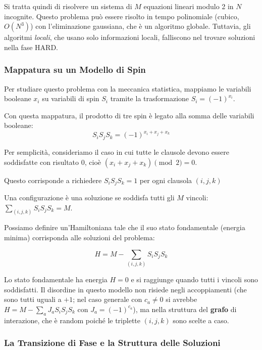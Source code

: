 Si tratta quindi di risolvere un sistema di $M$ equazioni lineari modulo 2 in $N$ incognite. Questo problema può essere risolto in tempo polinomiale (cubico, $O(N^3)$) con l'eliminazione gaussiana, che è un algoritmo globale. 
Tuttavia, gli algoritmi \emph{locali}, che usano solo informazioni locali, falliscono nel trovare soluzioni nella fase HARD. 

\subsubsection{Mappatura su un Modello di Spin}

Per studiare questo problema con la meccanica statistica, mappiamo le variabili booleane $x_i$ su variabili di spin $S_i$ tramite la trasformazione $S_i = (-1)^{x_i}$.  

Con questa mappatura, il prodotto di tre spin è legato alla somma delle variabili booleane:
\begin{equation}
  S_i S_j S_k =  (-1)^{x_i + x_j + x_k}   
\end{equation}


Per semplicità, consideriamo il caso in cui tutte le clausole devono essere soddisfatte con risultato 0, cioè $(x_i + x_j + x_k) \pmod 2 = 0$. 

\noindent Questo corrisponde a richiedere $S_i S_j S_k = 1$ per ogni clausola $(i,j,k)$

\noindent Una configurazione è una soluzione se soddisfa tutti gli $M$ vincoli:  $\sum_{(i,j,k)} S_i S_j S_k = M$.

Possiamo definire un'Hamiltoniana tale che il suo stato fondamentale (energia minima) corrisponda alle soluzioni del problema: 

\begin{equation}
H = M - \sum_{(i,j,k)} S_i S_j S_k
\end{equation}

Lo stato fondamentale ha energia $H=0$ e si raggiunge quando tutti i vincoli sono soddisfatti. Il disordine in questo modello non risiede negli accoppiamenti (che sono tutti uguali a $+1$; nel caso generale con $c_a \neq 0$ si avrebbe $H = M - \sum_a J_a S_i S_j S_k$ con $J_a = (-1)^{c_a}$), ma nella struttura del \textbf{grafo} di interazione, che è random poiché le triplette $(i,j,k)$ sono scelte a caso. 

\subsubsection{La Transizione di Fase e la Struttura delle Soluzioni}

